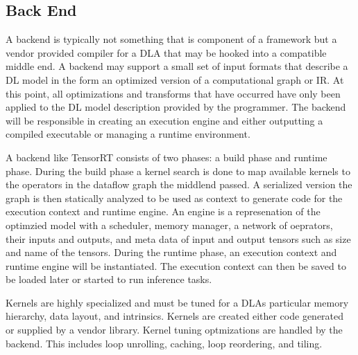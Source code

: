\subsection{Back End}
A backend is typically not something that is component of a framework
but a vendor provided compiler for a DLA that may be hooked into a compatible
middle end. A backend may support a small set of input formats that describe
a DL model in the form an optimized version of a computational graph or IR.
At this point, all optimizations and transforms that have occurred have
only been applied to the DL model description provided by the programmer.
The backend will be responsible in creating
an execution engine and either outputting a compiled executable or managing
a runtime environment.

A backend like TensorRT \cite{tensorRT} consists of two phases: a build phase
and runtime phase. During the build phase a kernel search is done to map
available kernels to the operators in the dataflow graph the middlend passed. A
serialized version the graph is then statically analyzed to be used as context
to generate code for the execution context and runtime engine.  An engine is a
represenation of the optimzied model with a scheduler, memory manager, a
network of oeprators, their inputs and outputs, and meta data of input and
output tensors such as size and name of the tensors.
During the runtime phase, an execution context and runtime engine will be
instantiated. The execution context can then be saved to be loaded later or started
to run inference tasks.

Kernels are highly specialized and must be tuned for a DLAs particular memory
hierarchy, data layout, and intrinsics. Kernels are created either code generated
or supplied by a vendor library. Kernel tuning optmizations are handled by the backend.
This includes loop unrolling, caching, loop reordering, and tiling.

